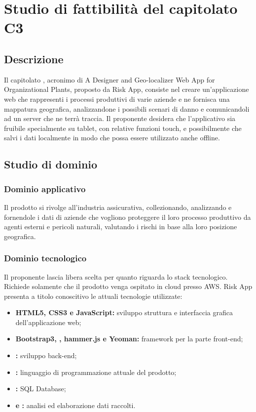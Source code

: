 \documentclass[../StudioDiFattibilita.tex]{subfiles}
\begin{document}
\section{Studio di fattibilità del capitolato C3}
	\subsection{Descrizione}
	Il capitolato , acronimo di A Designer and Geo-localizer Web App for Organizational Plants, proposto da Risk App, consiste nel creare un'applicazione web che rappresenti i processi produttivi di varie aziende e ne fornisca una mappatura geografica, analizzandone i possibili scenari di danno e comunicandoli ad un server che ne terrà traccia. Il proponente desidera che l'applicativo sia fruibile specialmente su tablet, con relative funzioni touch, e possibilmente che salvi i dati localmente in modo che possa essere utilizzato anche offline.
	
	\subsection{Studio di dominio}	
	  	\subsubsection{Dominio applicativo}
		Il prodotto si rivolge all'industria assicurativa, collezionando, analizzando e fornendole i dati di aziende che vogliono proteggere il loro processo produttivo da agenti esterni e pericoli naturali, valutando i rischi in base alla loro posizione geografica.
		
	 	\subsubsection{Dominio tecnologico}
		Il proponente lascia libera scelta per quanto riguarda lo stack tecnologico. Richiede solamente che il prodotto venga ospitato in cloud presso AWS. Risk App presenta a titolo conoscitivo le attuali tecnologie utilizzate:
		\begin{itemize}
			\item \textbf{HTML5, CSS3 e JavaScript:} sviluppo struttura e interfaccia grafica dell'applicazione web;
			\item \textbf{Bootstrap3, , hammer.js e Yeoman:} framework per la parte front-end;
			\item \textbf{:} sviluppo back-end;
			\item \textbf{:} linguaggio di programmazione attuale del prodotto;
			\item \textbf{:} SQL Database;
			\item \textbf{ e :} analisi ed elaborazione dati raccolti.
		\end{itemize}
		
\end{document}
